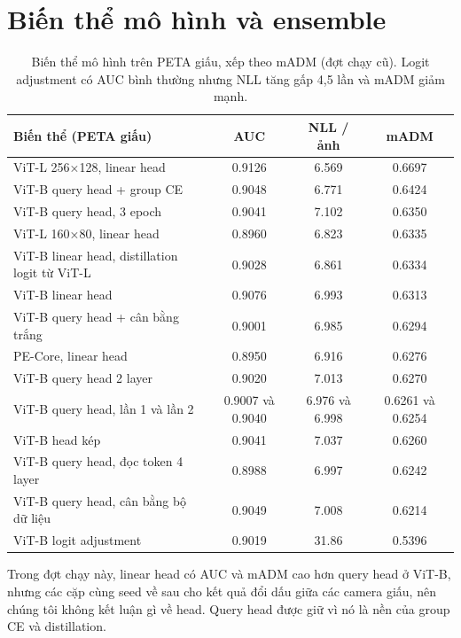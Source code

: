 \documentclass[11pt,a4paper]{article}
\begin{document}
\section{Biến thể mô hình và ensemble}
\label{app:var}

\begin{table}[H]
\centering\small
\begin{tabular}{@{}lccc@{}}
\toprule
Biến thể (PETA giấu) & AUC & NLL / ảnh & mADM \\
\midrule
ViT-L 256×128, linear head & 0.9126 & 6.569 & 0.6697 \\
ViT-B query head + group CE & 0.9048 & 6.771 & 0.6424 \\
ViT-B query head, 3 epoch & 0.9041 & 7.102 & 0.6350 \\
ViT-L 160×80, linear head & 0.8960 & 6.823 & 0.6335 \\
ViT-B linear head, distillation logit từ ViT-L & 0.9028 & 6.861 & 0.6334 \\
ViT-B linear head & 0.9076 & 6.993 & 0.6313 \\
ViT-B query head + cân bằng trắng & 0.9001 & 6.985 & 0.6294 \\
PE-Core, linear head & 0.8950 & 6.916 & 0.6276 \\
ViT-B query head 2 layer & 0.9020 & 7.013 & 0.6270 \\
ViT-B query head, lần 1 và lần 2 & 0.9007 và 0.9040 & 6.976 và 6.998 & 0.6261 và 0.6254 \\
ViT-B head kép & 0.9041 & 7.037 & 0.6260 \\
ViT-B query head, đọc token 4 layer & 0.8988 & 6.997 & 0.6242 \\
ViT-B query head, cân bằng bộ dữ liệu & 0.9049 & 7.008 & 0.6214 \\
ViT-B logit adjustment & 0.9019 & 31.86 & 0.5396 \\
\bottomrule
\end{tabular}
\caption{Biến thể mô hình trên PETA giấu, xếp theo mADM (đợt chạy cũ). Logit adjustment có AUC bình thường nhưng NLL tăng gấp 4,5 lần và mADM giảm mạnh.}
\label{tab:var}
\end{table}

Trong đợt chạy này, linear head có AUC và mADM cao hơn query head ở ViT-B, nhưng các cặp cùng seed về sau cho kết quả đổi dấu giữa các camera giấu, nên chúng tôi không kết luận gì về head. Query head được giữ vì nó là nền của group CE và distillation.
\end{document}

